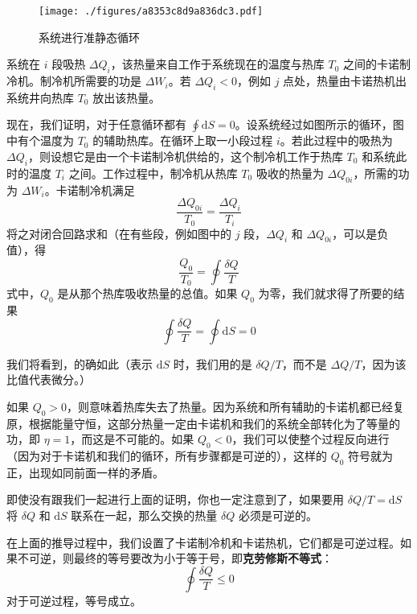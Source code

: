 \begin{figure}[ht]
\centering
\texttt{[image: ./figures/a8353c8d9a836dc3.pdf]}
\caption{系统进行准静态循环} \label{fig_Entrop_1}
\end{figure}

系统在 $i$ 段吸热 $\Delta Q_i$，该热量来自工作于系统现在的温度与热库 $T_0$ 之间的卡诺制冷机。制冷机所需要的功是 $\Delta W_i$。若 $\Delta Q_i<0$，例如 $j$ 点处，热量由卡诺热机出系统井向热库 $T_0$ 放出该热量。

现在，我们证明，对于任意循环都有 $\oint \mathrm d S =0 $。设系统经过如图所示的循环，图中有个温度为 $T_0$ 的辅助热库。在循环上取一小段过程 $i$。若此过程中的吸热为 $\Delta Q_i$，则设想它是由一个卡诺制冷机供给的，这个制冷机工作于热库 $T_0$ 和系统此时的温度 $T_i$ 之间。工作过程中，制冷机从热库 $T_0$ 吸收的热量为 $\Delta Q_{0i}$，所需的功为 $\Delta W_i$。卡诺制冷机满足
\begin{equation}
\frac{\Delta Q_{0i}}{T_0}=\frac{\Delta Q_i}{T_i}
\end{equation}
将之对闭合回路求和（在有些段，例如图中的 $j$ 段，$\Delta Q_i$ 和 $\Delta Q_{0i}$，可以是负值），得
\begin{equation}
\frac{Q_0}{T_0}=\oint{\frac{\delta Q}{T}}
\end{equation}
式中，$Q_0$ 是从那个热库吸收热量的总值。如果 $Q_0$ 为零，我们就求得了所要的结果
\begin{equation}
\oint{\frac{\delta Q}{T}=\oint{\text{d}S=0}}
\end{equation}

我们将看到，的确如此（表示 $\mathrm dS $ 时，我们用的是 $\delta Q/T$，而不是 $\Delta Q/T$，因为该比值代表微分。）

如果 $Q_0>0$，则意味着热库失去了热量。因为系统和所有辅助的卡诺机都已经复原，根据能量守恒，这部分热量一定由卡诺机和我们的系统全部转化为了等量的功，即 $\eta=1$，而这是不可能的。如果 $Q_0<0$，我们可以使整个过程反向进行（因为对于卡诺机和我们的循环，所有步骤都是可逆的），这样的 $Q_0$ 符号就为正，出现如同前面一样的矛盾。

即使没有跟我们一起进行上面的证明，你也一定注意到了，如果要用 $\delta Q/T=\mathrm d S$ 将 $\delta Q$ 和 $\mathrm dS$ 联系在一起，那么交换的热量 $\delta Q$ 必须是可逆的。

在上面的推导过程中，我们设置了卡诺制冷机和卡诺热机，它们都是可逆过程。如果不可逆，则最终的等号要改为小于等于号，即\textbf{克劳修斯不等式}：
\begin{equation}
\oint \frac{\delta Q}{T}\le 0
\end{equation}
对于可逆过程，等号成立。

